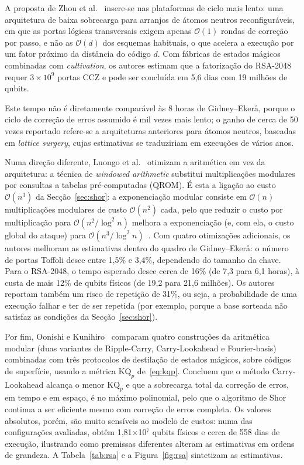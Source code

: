 \documentclass[11pt,a4paper]{article}
\begin{document}
A proposta de Zhou et al.~\cite{zhou2025} insere-se nas plataformas de ciclo mais lento: uma arquitetura de baixa sobrecarga para arranjos de átomos neutros reconfiguráveis, em que as portas lógicas transversais exigem apenas $\mathcal{O}(1)$ rondas de correção por passo, e não as $\mathcal{O}(d)$ dos esquemas habituais, o que acelera a execução por um fator próximo da distância do código $d$. Com fábricas de estados mágicos combinadas com \emph{cultivation}, os autores estimam que a fatorização do RSA-2048 requer $3\times 10^{9}$ portas CCZ e pode ser concluída em 5,6 dias com 19 milhões de qubits.

Este tempo não é diretamente comparável às 8 horas de Gidney--Ekerå, porque o ciclo de correção de erros assumido é mil vezes mais lento; o ganho de cerca de 50 vezes reportado refere-se a arquiteturas anteriores para átomos neutros, baseadas em \emph{lattice surgery}, cujas estimativas se traduziriam em execuções de vários anos.

Numa direção diferente, Luongo et al.~\cite{luongo2025} otimizam a aritmética em vez da arquitetura: a técnica de \emph{windowed arithmetic} substitui multiplicações modulares por consultas a tabelas pré-computadas (QROM). É esta a ligação ao custo $\mathcal{O}(n^{3})$ da Secção~\ref{sec:shor}: a exponenciação modular consiste em $\mathcal{O}(n)$ multiplicações modulares de custo $\mathcal{O}(n^{2})$ cada, pelo que reduzir o custo por multiplicação para $\mathcal{O}(n^{2}/\log^{2} n)$ melhora a exponenciação (e, com ela, o custo global do ataque) para $\mathcal{O}(n^{3}/\log^{2} n)$~\cite{luongo2025}. Com quatro otimizações adicionais, os autores melhoram as estimativas dentro do quadro de Gidney--Ekerå: o número de portas Toffoli desce entre 1,5\% e 3,4\%, dependendo do tamanho da chave. Para o RSA-2048, o tempo esperado desce cerca de 16\% (de 7,3 para 6,1 horas), à custa de mais 12\% de qubits físicos (de 19,2 para 21,6 milhões). Os autores reportam também um risco de repetição de 31\%, ou seja, a probabilidade de uma execução falhar e ter de ser repetida (por exemplo, porque a base sorteada não satisfaz as condições da Secção~\ref{sec:shor}).

Por fim, Oonishi e Kunihiro~\cite{oonishi2026} comparam quatro construções da aritmética modular (duas variantes de Ripple-Carry, Carry-Lookahead e Fourier-basis) combinadas com três protocolos de destilação de estados mágicos, sobre códigos de superfície, usando a métrica $\mathrm{KQ}_p$ de~\eqref{eq:kqp}. Concluem que o método Carry-Lookahead alcança o menor $\mathrm{KQ}_p$ e que a sobrecarga total da correção de erros, em tempo e em espaço, é no máximo polinomial, pelo que o algoritmo de Shor continua a ser eficiente mesmo com correção de erros completa. Os valores absolutos, porém, são muito sensíveis ao modelo de custos: numa das configurações avaliadas, obtêm 1,81$\times$10$^{7}$ qubits físicos e cerca de 558 dias de execução, ilustrando como premissas diferentes alteram as estimativas em ordens de grandeza. A Tabela~\ref{tab:rsa} e a Figura~\ref{fig:rsa} sintetizam as estimativas.
\end{document}
